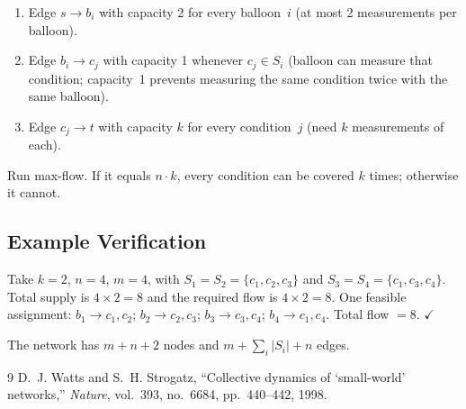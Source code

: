 \documentclass[11pt,a4paper]{article}
\begin{document}
\begin{enumerate}
    \item Edge $s \to b_i$ with capacity 2 for every balloon~$i$ (at most 2 measurements per balloon).
    \item Edge $b_i \to c_j$ with capacity 1 whenever $c_j \in S_i$ (balloon can measure that condition; capacity~1 prevents measuring the same condition twice with the same balloon).
    \item Edge $c_j \to t$ with capacity $k$ for every condition~$j$ (need $k$ measurements of each).
\end{enumerate}

Run max-flow. If it equals $n \cdot k$, every condition can be covered $k$ times; otherwise it cannot.

\subsection*{Example Verification}

Take $k=2$, $n=4$, $m=4$, with $S_1 = S_2 = \{c_1,c_2,c_3\}$ and $S_3 = S_4 = \{c_1,c_3,c_4\}$. Total supply is $4 \times 2 = 8$ and the required flow is $4 \times 2 = 8$. One feasible assignment: $b_1 \to c_1, c_2$;\; $b_2 \to c_2, c_3$;\; $b_3 \to c_3, c_4$;\; $b_4 \to c_1, c_4$. Total flow $= 8$. $\checkmark$

The network has $m + n + 2$ nodes and $m + \sum_i |S_i| + n$ edges.


\begin{thebibliography}{9}
D.~J. Watts and S.~H. Strogatz,
``Collective dynamics of `small-world' networks,''
\textit{Nature}, vol.~393, no.~6684, pp.~440--442, 1998.
\end{thebibliography}
\end{document}
